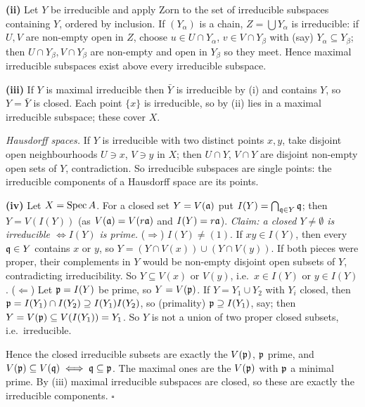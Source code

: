 \documentclass[11pt]{article}
\begin{document}
\textbf{(ii)} Let $Y$ be irreducible and apply Zorn to the set of irreducible subspaces containing $Y$, ordered by inclusion. If $(Y_\alpha)$ is a chain, $Z=\bigcup Y_\alpha$ is irreducible: if $U,V$ are non-empty open in $Z$, choose $u\in U\cap Y_\alpha$, $v\in V\cap Y_\beta$ with (say) $Y_\alpha\subseteq Y_\beta$; then $U\cap Y_\beta,V\cap Y_\beta$ are non-empty and open in $Y_\beta$ so they meet. Hence maximal irreducible subspaces exist above every irreducible subspace.

\textbf{(iii)} If $Y$ is maximal irreducible then $\bar Y$ is irreducible by (i) and contains $Y$, so $Y=\bar Y$ is closed. Each point $\{x\}$ is irreducible, so by (ii) lies in a maximal irreducible subspace; these cover $X$.

\emph{Hausdorff spaces.} If $Y$ is irreducible with two distinct points $x,y$, take disjoint open neighbourhoods $U\ni x$, $V\ni y$ in $X$; then $U\cap Y$, $V\cap Y$ are disjoint non-empty open sets of $Y$, contradiction. So irreducible subspaces are single points: the irreducible components of a Hausdorff space are its points.

\textbf{(iv)} Let $X=\operatorname{Spec} A$. For a closed set $Y=V(\mathfrak a)$ put $I(Y)=\bigcap_{\mathfrak q\in Y}\mathfrak q$; then $Y=V(I(Y))$ (as $V(\mathfrak a)=V(r\mathfrak a)$ and $I(Y)=r\mathfrak a$). \emph{Claim: a closed $Y\neq\emptyset$ is irreducible $\iff I(Y)$ is prime.}
($\Rightarrow$) $I(Y)\neq(1)$. If $xy\in I(Y)$, then every $\mathfrak q\in Y$ contains $x$ or $y$, so $Y=(Y\cap V(x))\cup(Y\cap V(y))$. If both pieces were proper, their complements in $Y$ would be non-empty disjoint open subsets of $Y$, contradicting irreducibility. So $Y\subseteq V(x)$ or $V(y)$, i.e.\ $x\in I(Y)$ or $y\in I(Y)$.
($\Leftarrow$) Let $\mathfrak p=I(Y)$ be prime, so $Y=V(\mathfrak p)$. If $Y=Y_1\cup Y_2$ with $Y_i$ closed, then $\mathfrak p=I(Y_1)\cap I(Y_2)\supseteq I(Y_1)I(Y_2)$, so (primality) $\mathfrak p\supseteq I(Y_1)$, say; then $Y=V(\mathfrak p)\subseteq V(I(Y_1))=Y_1$. So $Y$ is not a union of two proper closed subsets, i.e.\ irreducible.

Hence the closed irreducible subsets are exactly the $V(\mathfrak p)$, $\mathfrak p$ prime, and $V(\mathfrak p)\subseteq V(\mathfrak q)\iff\mathfrak q\subseteq\mathfrak p$. The maximal ones are the $V(\mathfrak p)$ with $\mathfrak p$ a minimal prime. By (iii) maximal irreducible subspaces are closed, so these are exactly the irreducible components. \hfill$\square$
\end{document}
